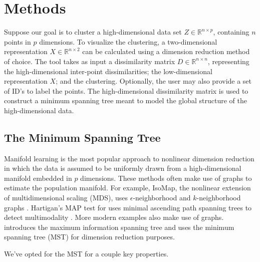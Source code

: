 \documentclass{article}
\begin{document}
\section{Methods}
Suppose our goal is to cluster a high-dimensional data set $Z \in \mathbb{R}^{n \times p}$, containing $n$ points in $p$ dimensions. To visualize the clustering, a two-dimensional representation $X \in \mathbb{R}^{n \times 2}$ can be calculated using a dimension reduction method of choice. The tool takes as input a dissimilarity matrix $D \in \mathbb{R}^{n \times n}$, representing the high-dimensional inter-point dissimilarities; the low-dimensional representation $X$; and the clustering. Optionally, the user may also provide a set of ID's to label the points. The high-dimensional dissimilarity matrix is used to construct a minimum spanning tree meant to model the global structure of the high-dimensional data.

\subsection{The Minimum Spanning Tree}
Manifold learning is the most popular approach to nonlinear dimension reduction in which the data is assumed to be uniformly drawn from a high-dimensional manifold embedded in $p$ dimensions. These methods often make use of graphs to estimate the population manifold. For example, IsoMap, the nonlinear extension of multidimensional scaling (MDS), uses
$\epsilon$-neighborhood and $k$-neighborhood graphs \cite{IsoMap}. Hartigan's MAP test for uses minimal ascending path spanning trees to detect multimodality \cite{MAP test}. More modern examples also make use of graphs. \cite{MIST example} introduces the maximum information spanning tree and \cite{MST example} uses the minimum spanning tree (MST) for dimension reduction purposes.

We've opted for the MST for a couple key properties.

\newpage
\end{document}
